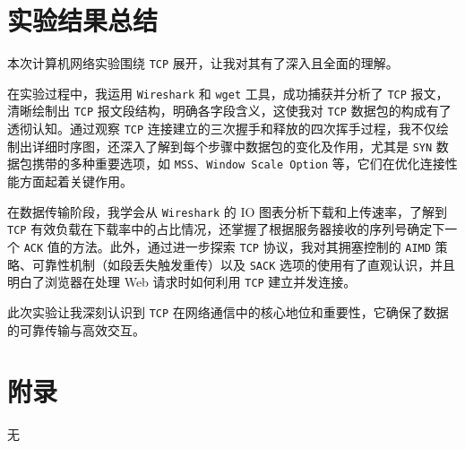 \documentclass{article}
\begin{document}
\section{实验结果总结}

本次计算机网络实验围绕 \texttt{TCP} 展开，让我对其有了深入且全面的理解。

在实验过程中，我运用 \texttt{Wireshark} 和 \texttt{wget} 工具，成功捕获并分析了 \texttt{TCP} 报文，清晰绘制出 \texttt{TCP} 报文段结构，明确各字段含义，这使我对 \texttt{TCP} 数据包的构成有了透彻认知。通过观察 \texttt{TCP} 连接建立的三次握手和释放的四次挥手过程，我不仅绘制出详细时序图，还深入了解到每个步骤中数据包的变化及作用，尤其是 \texttt{SYN} 数据包携带的多种重要选项，如 \texttt{MSS}、\texttt{Window Scale Option} 等，它们在优化连接性能方面起着关键作用。

在数据传输阶段，我学会从 \texttt{Wireshark} 的 IO 图表分析下载和上传速率，了解到 \texttt{TCP} 有效负载在下载率中的占比情况，还掌握了根据服务器接收的序列号确定下一个 \texttt{ACK} 值的方法。此外，通过进一步探索 \texttt{TCP} 协议，我对其拥塞控制的 \texttt{AIMD} 策略、可靠性机制（如段丢失触发重传）以及 \texttt{SACK} 选项的使用有了直观认识，并且明白了浏览器在处理 Web 请求时如何利用 \texttt{TCP} 建立并发连接。

此次实验让我深刻认识到 \texttt{TCP} 在网络通信中的核心地位和重要性，它确保了数据的可靠传输与高效交互。

\section{附录}

无
\end{document}
